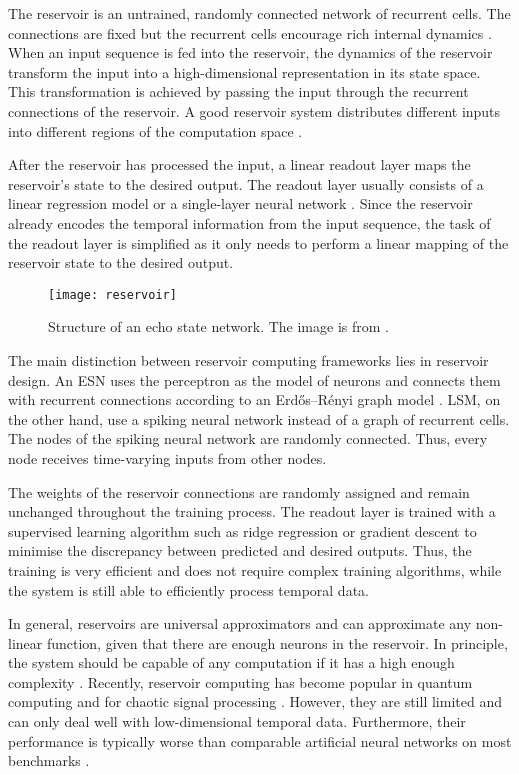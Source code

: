 The reservoir is an untrained, randomly connected network of recurrent cells. The connections are fixed but the recurrent cells encourage rich internal dynamics . When an input sequence is fed into the reservoir, the dynamics of the reservoir transform the input into a high-dimensional representation in its state space. This transformation is achieved by passing the input through the recurrent connections of the reservoir.
A good reservoir system distributes different inputs into different regions of the computation space .

After the reservoir has processed the input, a linear readout layer maps the reservoir's state to the desired output. The readout layer usually consists of a linear regression model or a single-layer neural network \cite{tanaka_recent_2019}. Since the reservoir already encodes the temporal information from the input sequence, the task of the readout layer is simplified as it only needs to perform a linear mapping of the reservoir state to the desired output.
%
\begin{figure}[h]
    \centering
    \texttt{[image: reservoir]}
    \caption[Structure of an echo state network]{Structure of an echo state network. The image is from .}
\end{figure}
%
The main distinction between reservoir computing frameworks lies in reservoir design.
An ESN uses the perceptron as the model of neurons and connects them with recurrent connections according to an Erdős–Rényi graph model .
LSM, on the other hand, use a spiking neural network instead of a graph of recurrent cells.
The nodes of the spiking neural network are randomly connected.
Thus, every node receives time-varying inputs from other nodes.

The weights of the reservoir connections are randomly assigned and remain unchanged throughout the training process. The readout layer is trained with a supervised learning algorithm such as ridge regression or gradient descent to minimise the discrepancy between predicted and desired outputs.
Thus, the training is very efficient and does not require complex training algorithms, while the system is still able to efficiently process temporal data.

In general, reservoirs are universal approximators and can approximate any non-linear function, given that there are enough neurons in the reservoir.
In principle, the system should be capable of any computation if it has a high enough complexity \cite{adamatzky_reservoir_2018}.
Recently, reservoir computing has become popular in quantum computing \cite{ghosh_quantum_2019, chen_temporal_2020} and for chaotic signal processing \cite{vlachas_backpropagation_2020, krishnagopal_separation_2020}.
However, they are still limited and can only deal well with low-dimensional temporal data. Furthermore, their performance is typically worse than comparable artificial neural networks on most benchmarks \cite{tanaka_recent_2019}.
